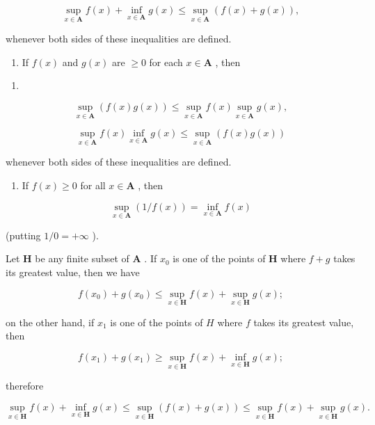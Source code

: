 \[
\sup _ {x \in \mathbf {A}} f (x) + \inf _ {x \in \mathbf {A}} g (x) \leqslant \sup _ {x \in \mathbf {A}} (f (x) + g (x)),\tag{18}
\]

whenever both sides of these inequalities are defined.

\begin{enumerate}
\def\labelenumi{(\roman{enumi})}
\setcounter{enumi}{1}
\tightlist
\item
  If \(f(x)\) and \(g(x)\) are \(\geqslant 0\) for each \(x \in \mathbf{A}\) , then
\end{enumerate}

\begin{enumerate}
\def\labelenumi{(\arabic{enumi})}
\setcounter{enumi}{18}
\tightlist
\item
\end{enumerate}

\[
\sup _ {x \in \mathbf {A}} (f (x) g (x)) \leqslant \sup _ {x \in \mathbf {A}} f (x) \sup _ {x \in \mathbf {A}} g (x),\tag{19}
\]

\[
\sup _ {x \in \mathbf {A}} f (x) \inf _ {x \in \mathbf {A}} g (x) \leqslant \sup _ {x \in \mathbf {A}} (f (x) g (x))\tag{20}
\]

whenever both sides of these inequalities are defined.

\begin{enumerate}
\def\labelenumi{(\roman{enumi})}
\setcounter{enumi}{2}
\tightlist
\item
  If \(f(x) \geqslant 0\) for all \(x \in \mathbf{A}\) , then
\end{enumerate}

\[
\sup _ {x \in \mathbf {A}} (1 / f (x)) = \inf _ {x \in \mathbf {A}} f (x)\tag{21}
\]

(putting \(1 / 0 = +\infty\) ).

Let \(\mathbf{H}\) be any finite subset of \(\mathbf{A}\) . If \(x_0\) is one of the points of \(\mathbf{H}\) where \(f + g\) takes its greatest value, then we have

\[
f (x _ {0}) + g (x _ {0}) \leqslant \sup _ {x \in \mathbf {H}} f (x) + \sup _ {x \in \mathbf {H}} g (x);
\]

on the other hand, if \(x_{1}\) is one of the points of \(H\) where \(f\) takes its greatest value, then

\[
f (x _ {1}) + g (x _ {1}) \geqslant \sup _ {x \in \mathbf {H}} f (x) + \inf _ {x \in \mathbf {H}} g (x);
\]

therefore

\[
\sup _ {x \in \mathbf {H}} f (x) + \inf _ {x \in \mathbf {H}} g (x) \leqslant \sup _ {x \in \mathbf {H}} (f (x) + g (x)) \leqslant \sup _ {x \in \mathbf {H}} f (x) + \sup _ {x \in \mathbf {H}} g (x).
\]

